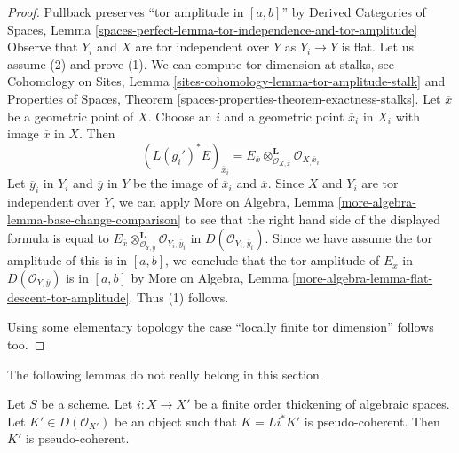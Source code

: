 \begin{proof}
Pullback preserves ``tor amplitude in $[a, b]$'' by
Derived Categories of Spaces, Lemma
\ref{spaces-perfect-lemma-tor-independence-and-tor-amplitude}
Observe that $Y_i$ and $X$ are tor independent over $Y$
as $Y_i \to Y$ is flat. Let us assume (2) and prove (1).
We can compute tor dimension at stalks, see
Cohomology on Sites, Lemma \ref{sites-cohomology-lemma-tor-amplitude-stalk}
and Properties of Spaces, Theorem
\ref{spaces-properties-theorem-exactness-stalks}.
Let $\overline{x}$ be a geometric point of $X$. Choose
an $i$ and a geometric point $\overline{x}_i$ in $X_i$ with image
$\overline{x}$ in $X$. Then
$$
(L(g_i')^*E)_{\overline{x}_i} =
E_{\overline{x}}
\otimes_{\mathcal{O}_{X, \overline{x}}}^\mathbf{L}
\mathcal{O}_{X_, \overline{x}_i}
$$
Let $\overline{y}_i$ in $Y_i$ and $\overline{y}$ in $Y$
be the image of $\overline{x}_i$ and $\overline{x}$.
Since $X$ and $Y_i$ are tor independent over $Y$, we can apply
More on Algebra, Lemma \ref{more-algebra-lemma-base-change-comparison}
to see that the right hand side of the displayed formula is equal to
$E_{\overline{x}}
\otimes_{\mathcal{O}_{Y, \overline{y}}}^\mathbf{L}
\mathcal{O}_{Y_i, \overline{y}_i}$
in $D(\mathcal{O}_{Y_i, \overline{y}_i})$.
Since we have assume the tor amplitude of this is in
$[a, b]$, we conclude that the tor amplitude of
$E_{\overline{x}}$ in $D(\mathcal{O}_{Y, \overline{y}})$
is in $[a, b]$ by More on Algebra, Lemma
\ref{more-algebra-lemma-flat-descent-tor-amplitude}.
Thus (1) follows.

\medskip\noindent
Using some elementary topology the case
``locally finite tor dimension'' follows too.
\end{proof}

\noindent
The following lemmas do not really belong in this section.

\begin{lemma}
\label{lemma-thickening-pseudo-coherent}
Let $S$ be a scheme. Let $i : X \to X'$ be a finite order thickening of
algebraic spaces. Let $K' \in D(\mathcal{O}_{X'})$ be an object such that
$K = Li^*K'$ is pseudo-coherent. Then $K'$ is pseudo-coherent.
\end{lemma}


